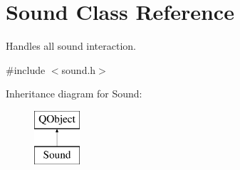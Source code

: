 \hypertarget{class_sound}{}\section{Sound Class Reference}
\label{class_sound}


Handles all sound interaction.  




{\ttfamily \#include $<$sound.\+h$>$}

Inheritance diagram for Sound\+:\begin{figure}[H]
\begin{center}
\leavevmode
\includegraphics[height=2.000000cm]{class_sound}
\end{center}
\end{figure}
